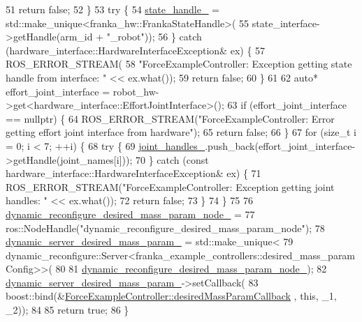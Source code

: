 \begin{DoxyCode}
51     \textcolor{keywordflow}{return} \textcolor{keyword}{false};
52   \}
53   \textcolor{keywordflow}{try} \{
54     \hyperlink{classfranka__example__controllers_1_1ForceExampleController_a4b932a6c22504e9728c57b5fa7ccd620}{state\_handle\_} = std::make\_unique<franka\_hw::FrankaStateHandle>(
55         state\_interface->getHandle(arm\_id + \textcolor{stringliteral}{"\_robot"}));
56   \} \textcolor{keywordflow}{catch} (hardware\_interface::HardwareInterfaceException& ex) \{
57     ROS\_ERROR\_STREAM(
58         \textcolor{stringliteral}{"ForceExampleController: Exception getting state handle from interface: "} << ex.what());
59     \textcolor{keywordflow}{return} \textcolor{keyword}{false};
60   \}
61 
62   \textcolor{keyword}{auto}* effort\_joint\_interface = robot\_hw->get<hardware\_interface::EffortJointInterface>();
63   \textcolor{keywordflow}{if} (effort\_joint\_interface == \textcolor{keyword}{nullptr}) \{
64     ROS\_ERROR\_STREAM(\textcolor{stringliteral}{"ForceExampleController: Error getting effort joint interface from hardware"});
65     \textcolor{keywordflow}{return} \textcolor{keyword}{false};
66   \}
67   \textcolor{keywordflow}{for} (\textcolor{keywordtype}{size\_t} i = 0; i < 7; ++i) \{
68     \textcolor{keywordflow}{try} \{
69       \hyperlink{classfranka__example__controllers_1_1ForceExampleController_aed2074f77427deafe9b8670430f5a760}{joint\_handles\_}.push\_back(effort\_joint\_interface->getHandle(joint\_names[i]));
70     \} \textcolor{keywordflow}{catch} (\textcolor{keyword}{const} hardware\_interface::HardwareInterfaceException& ex) \{
71       ROS\_ERROR\_STREAM(\textcolor{stringliteral}{"ForceExampleController: Exception getting joint handles: "} << ex.what());
72       \textcolor{keywordflow}{return} \textcolor{keyword}{false};
73     \}
74   \}
75 
76   \hyperlink{classfranka__example__controllers_1_1ForceExampleController_a52ea54759485f09d5b7985b56f1d592a}{dynamic\_reconfigure\_desired\_mass\_param\_node\_} =
77       ros::NodeHandle(\textcolor{stringliteral}{"dynamic\_reconfigure\_desired\_mass\_param\_node"});
78   \hyperlink{classfranka__example__controllers_1_1ForceExampleController_ad17a6b653b79b4652bf39f26fda0f001}{dynamic\_server\_desired\_mass\_param\_} = std::make\_unique<
79       dynamic\_reconfigure::Server<franka\_example\_controllers::desired\_mass\_paramConfig>>(
80 
81       \hyperlink{classfranka__example__controllers_1_1ForceExampleController_a52ea54759485f09d5b7985b56f1d592a}{dynamic\_reconfigure\_desired\_mass\_param\_node\_});
82   \hyperlink{classfranka__example__controllers_1_1ForceExampleController_ad17a6b653b79b4652bf39f26fda0f001}{dynamic\_server\_desired\_mass\_param\_}->setCallback(
83       boost::bind(&\hyperlink{classfranka__example__controllers_1_1ForceExampleController_ac7db01746d2398acab73424e6a98f501}{ForceExampleController::desiredMassParamCallback}
      , \textcolor{keyword}{this}, \_1, \_2));
84 
85   \textcolor{keywordflow}{return} \textcolor{keyword}{true};
86 \}
\end{DoxyCode}
